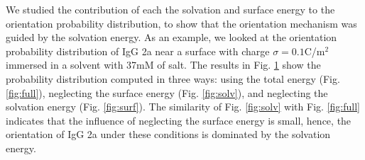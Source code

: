 \documentclass[article,notitlepage]{revtex4-1}
\begin{document}
We studied the contribution of each the solvation and surface energy to the orientation probability distribution, to show that the orientation mechanism was guided by the solvation energy.
As an example, we looked at the orientation probability distribution of IgG 2a near a surface with charge $\sigma=0.1$C/m$^2$ immersed in a solvent with 37mM of salt. 
The results in Fig. \ref{fig:supp} show the probability distribution computed in three ways: using the total energy (Fig. \ref{fig:full}), neglecting the surface energy (Fig. \ref{fig:solv}), and neglecting the solvation energy (Fig. \ref{fig:surf}). 
The similarity of Fig. \ref{fig:solv} with Fig. \ref{fig:full} indicates that the influence of neglecting the surface energy is small, hence, the orientation of IgG 2a under these conditions is dominated by the solvation energy.

\begin{figure} [h]
   \centering
   \\
   \caption{}
   \label{fig:supp}
\end{figure}
\end{document}
